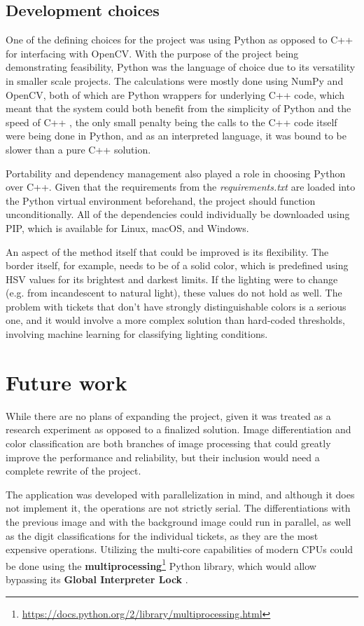 \documentclass[12pt]{report}
\theoremstyle{definition}
\theoremstyle{remark}
\begin{document}
\subsection{Development choices}
One of the defining choices for the project was using Python as opposed to C++ for interfacing with OpenCV. With the purpose of the project being demonstrating feasibility, Python was the language of choice due to its versatility in smaller scale projects. The calculations were mostly done using NumPy and OpenCV, both of which are Python wrappers for underlying C++ code, which meant that the system could both benefit from the simplicity of Python and the speed of C++ \cite{array_manipulation}, the only small penalty being the calls to the C++ code itself were being done in Python, and as an interpreted language, it was bound to be slower than a pure C++ solution.

Portability and dependency management also played a role in choosing Python over C++. Given that the requirements from the \textit{requirements.txt} are loaded into the Python virtual environment beforehand, the project should function unconditionally. All of the dependencies could individually be downloaded using PIP, which is available for Linux, macOS, and Windows.

An aspect of the method itself that could be improved is its flexibility. The border itself, for example, needs to be of a solid color, which is predefined using HSV values for its brightest and darkest limits. If the lighting were to change (e.g. from incandescent to natural light), these values do not hold as well. The problem with tickets that don't have strongly distinguishable colors is a serious one, and it would involve a more complex solution than hard-coded thresholds, involving machine learning for classifying lighting conditions.

\section{Future work}
While there are no plans of expanding the project, given it was treated as a research experiment as opposed to a finalized solution. Image differentiation and color classification are both branches of image processing that could greatly improve the performance and reliability, but their inclusion would need a complete rewrite of the project.

The application was developed with parallelization in mind, and although it does not implement it, the operations are not strictly serial. The differentiations with the previous image and with the background image could run in parallel, as well as the digit classifications for the individual tickets, as they are the most expensive operations. Utilizing the multi-core capabilities of modern CPUs could be done using the \textbf{multiprocessing}\footnote{\url{https://docs.python.org/2/library/multiprocessing.html}} Python library, which would allow bypassing its \textbf{Global Interpreter Lock} \cite{multiproc}.
\end{document}
